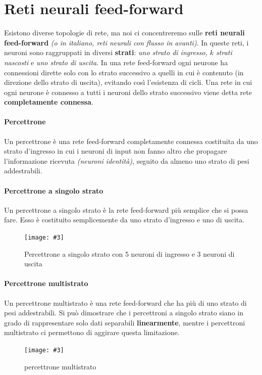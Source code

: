 \documentclass[12pt, twoside, letterpaper]{report}
\newcommand{\img}[4] {
	\begin{figure}
		\caption{#1}
		\centering
		\texttt{[image: \#3]}\\
		\label{#4}
	\end{figure}
}
\begin{document}
		\section{Reti neurali feed-forward}
			Esistono diverse topologie di rete, ma noi ci concentreremo sulle \textbf{reti neurali feed-forward} \textit{(o in italiano, reti neurali con flusso in avanti)}. In queste reti, i neuroni sono raggruppati in diversi \textbf{strati}: \textit{uno strato di ingresso, $k$ strati nascosti} e \textit{uno strato di uscita}. In una rete feed-forward ogni neurone ha connessioni dirette solo con lo strato successivo a quelli in cui è contenuto (in direzione dello strato di uscita), evitando così l'esistenza di cicli. Una rete in cui ogni neurone è connesso a tutti i neuroni dello strato successivo viene detta rete \textbf{completamente connessa}.
			\paragraph{Percettrone} Un percettrone è una rete feed-forward completamente connessa costituita da uno strato d'ingresso in cui i neuroni di input non fanno altro che propagare l'informazione ricevuta \textit{(neuroni identità)}, seguito  da almeno uno strato di pesi addestrabili.%
			
			\paragraph{Percettrone a singolo strato} Un percettrone a singolo strato è la rete feed-forward più semplice che si possa fare. Esso è costituito semplicemente da uno strato d'ingresso e uno di uscita. 
				\img{Percettrone a singolo strato con 5 neuroni di ingresso e 3 neuroni di uscita}{0.5}{slp.png}{slp} 
				
			\paragraph{Percettrone multistrato} Un percettrone multistrato è una rete feed-forward che ha più di uno strato di pesi addestrabili. Si può dimostrare che i percettroni a singolo strato siano in grado di rappresentare solo dati separabili \textbf{linearmente}, mentre i percettroni multistrato ci permettono di aggirare questa limitazione. 
				\img{percettrone multistrato}{0.5}{nn-feed-forward.png}{feedforward}
		
\end{document}
